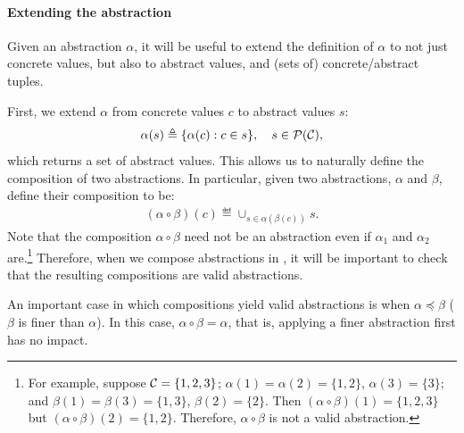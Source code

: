 \paragraph{Extending the abstraction}

Given an abstraction $\alpha$, it will be useful to extend the definition of
$\alpha$ to not just concrete values, but also to abstract values,
and (sets of) concrete/abstract tuples.

First, we extend $\alpha$ from concrete values $c$ to abstract values $s$:
\begin{align}
\alpha(s) \triangleq \{ \alpha(c) : c \in s \}, \quad s \in \mathcal{P}(\mathcal{C}),
\end{align}
which returns a set of abstract values.
This allows us to naturally define the composition of two abstractions.
In particular, given two abstractions, $\alpha$ and $\beta$,
define their composition to be:
\begin{align}
(\alpha \circ \beta)(c) \eqdef \cup_{s \in \alpha(\beta(c))} s.
\end{align}
Note that the composition $\alpha \circ \beta$ need not be an abstraction
even if $\alpha_1$ and $\alpha_2$ are.\footnote{For example,
suppose $\mathcal{C} = \{1,2,3\}$;
$\alpha(1) = \alpha(2) = \{1,2\}$, $\alpha(3) = \{ 3 \}$; and
$\beta(1) = \beta(3) = \{1,3\}$, $\beta(2) = \{ 2 \}$.
Then $(\alpha \circ \beta)(1) = \{1,2,3\}$ but $(\alpha \circ \beta)(2) = \{1,2\}$.
Therefore, $\alpha \circ \beta$ is not a valid abstraction.
}
Therefore, when we compose abstractions in ,
it will be important to check that the resulting compositions are valid abstractions.

An important case in which compositions yield valid abstractions
is when $\alpha \preceq \beta$ ($\beta$ is finer than $\alpha$).
In this case, $\alpha \circ \beta = \alpha$, that is,
applying a finer abstraction first has no impact.

